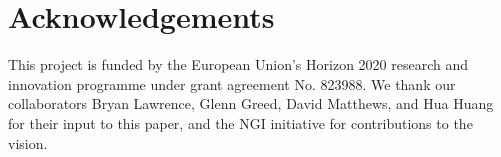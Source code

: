 \documentclass{superfri}
\begin{document}
\section*{Acknowledgements}

\small
This project is funded by the European Union's Horizon 2020 research and innovation programme under grant agreement No. 823988.
We thank our collaborators Bryan Lawrence, Glenn Greed, David Matthews, and Hua Huang for their input to this paper, and the NGI initiative for contributions to the vision.

\openaccess


\end{document}
